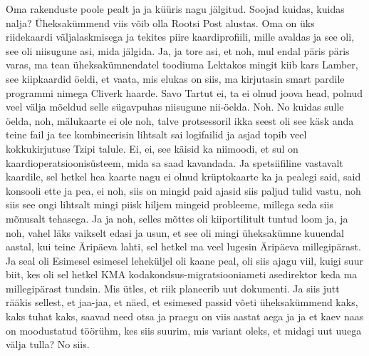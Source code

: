 Oma rakenduste poole pealt ja ja küüris nagu jälgitud. Soojad kuidas, kuidas nalja? Üheksakümmend viis võib olla Rootsi Post alustas.
Oma on üks riidekaardi väljalaskmisega ja tekites piire kaardiprofiili, mille avaldas ja see oli, see oli niisugune asi, mida jälgida. Ja, ja tore asi, et noh, mul endal päris päris varas, ma tean üheksakümnendatel toodiuma Lektakos mingit kiib kars Lamber, see kiipkaardid öeldi, et vaata, mis elukas on siis, ma kirjutasin smart pardile programmi nimega Cliverk haarde. Savo Tartut ei, ta ei olnud joova head, polnud veel välja mõeldud selle sügavpuhas niisugune nii-öelda. Noh. No kuidas sulle öelda, noh, mälukaarte ei ole noh, talve protsessoril ikka seest oli see käsk anda teine fail ja tee kombineerisin lihtsalt sai logifailid ja asjad topib veel kokkukirjutuse Tzipi talule. Ei, ei, see käisid ka niimoodi, et sul on kaardioperatsioonisüsteem, mida sa saad kavandada. Ja spetsiifiline vastavalt kaardile, sel hetkel hea kaarte nagu ei olnud krüptokaarte ka ja pealegi said, said konsooli ette ja pea, ei noh, siis on mingid paid ajasid siis paljud tulid vastu, noh siis see ongi lihtsalt mingi piisk hiljem mingeid probleeme, millega seda siis mõnusalt tehasega. Ja ja noh, selles mõttes oli kiiportilitult tuntud loom ja, ja noh, vahel läks vaikselt edasi ja usun, et see oli mingi üheksakümne kuuendal aastal, kui teine Äripäeva lahti, sel hetkel ma veel lugesin Äripäeva millegipärast. Ja seal oli
Esimesel esimesel leheküljel oli kaane peal, oli siis ajagu viil, kuigi suur biit, kes oli sel hetkel KMA kodakondsus-migratsiooniameti asedirektor keda ma millegipärast tundsin. Mis ütles, et riik planeerib uut dokumenti.
Ja siis jutt rääkis sellest, et jaa-jaa, et näed, et esimesed passid võeti üheksakümmend kaks, kaks tuhat kaks, saavad need otsa ja praegu on viis aastat aega ja ja et kaev naas on moodustatud töörühm, kes siis suurim, mis variant oleks, et midagi uut uuega välja tulla? No siis.
